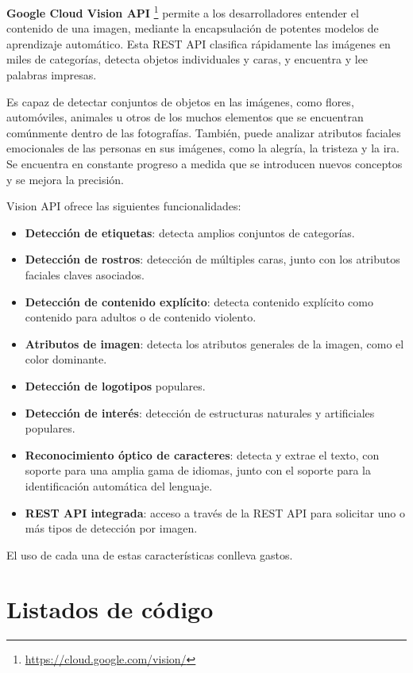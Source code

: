 \textbf{Google Cloud Vision API} \footnote{\url{https://cloud.google.com/vision/}} permite a los desarrolladores entender el contenido de una imagen, mediante la encapsulación de potentes modelos de aprendizaje automático. Esta REST API clasifica rápidamente las imágenes en miles de categorías, detecta objetos individuales y caras, y encuentra y lee palabras impresas.

Es capaz de detectar conjuntos de objetos en las imágenes, como flores, automóviles, animales u otros de los muchos elementos 
que se encuentran comúnmente dentro de las fotografías. También, puede analizar atributos faciales emocionales de las personas en sus imágenes, como la alegría, la tristeza y la ira. Se encuentra en constante progreso a medida que se introducen nuevos conceptos y se mejora la precisión.

Vision API ofrece las siguientes funcionalidades:
\begin{itemize}
\item \textbf{Detección de etiquetas}: detecta amplios conjuntos de categorías.
\item \textbf{Detección de rostros}: detección de múltiples caras, junto con los atributos faciales claves asociados.
\item \textbf{Detección de contenido explícito}: detecta contenido explícito como contenido para adultos o de contenido violento.
\item \textbf{Atributos de imagen}: detecta los atributos generales de la imagen, como el color dominante.
\item \textbf{Detección de logotipos} populares.
\item \textbf{Detección de interés}: detección de estructuras naturales y artificiales populares.
\item \textbf{Reconocimiento óptico de caracteres}: detecta y extrae el texto, con soporte para una amplia gama de idiomas, junto con el soporte para la identificación automática del lenguaje.
\item \textbf{REST API integrada}: acceso a través de la REST API para solicitar uno o más tipos de detección por imagen.
\end{itemize}

El uso de cada una de estas características conlleva gastos.

\section{Listados de código}
\label{sec:listado}

